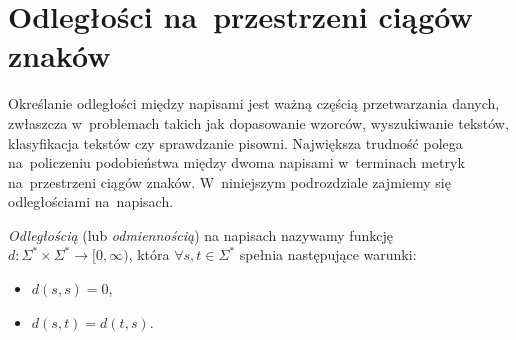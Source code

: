 \documentclass{praca1}
\begin{document}
%




\section{Odległości na~przestrzeni ciągów znaków}

Określanie odległości między napisami jest ważną częścią przetwarzania danych, zwłaszcza w~problemach takich jak dopasowanie wzorców, wyszukiwanie tekstów, klasyfikacja tekstów czy sprawdzanie pisowni. Największa trudność polega na~policzeniu podobieństwa między dwoma napisami w~terminach metryk na~przestrzeni ciągów znaków.  W~niniejszym podrozdziale zajmiemy się odległościami na~napisach.

\begin{definition}
\emph{Odległością} (lub \emph{odmiennością}) na napisach nazywamy funkcję $d: \Sigma^* \times \Sigma^* \rightarrow [0, \infty)$, która \hbox{$\forall s, t\!\in \Sigma^*$} spełnia następujące warunki:
\begin{itemize}
\item $d(s,s) = 0$,
\item $d(s,t) = d(t,s)$.
\end{itemize}
\end{definition}
\end{document}
